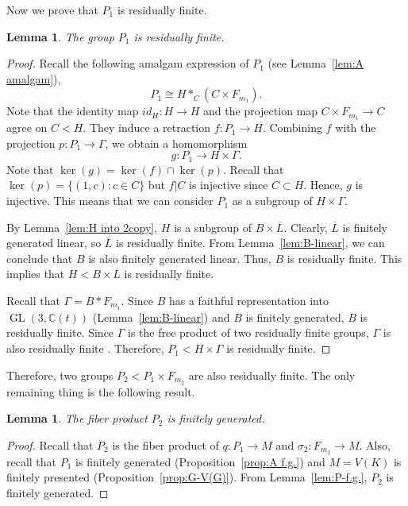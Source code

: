 \documentclass[11pt]{amsart}
\newtheorem{lem}[thm]{Lemma}
\theoremstyle{definition}
\DeclareMathOperator{\GL}{GL}
\newcommand{\CC}{\mathbb{C}}
\begin{document}
 Now we prove that $P_1$ is residually finite.

 \begin{lem} \label{lem:A rf}
 The group $P_1$ is residually finite.
 \end{lem}
 \begin{proof}
 Recall the following amalgam expression of $P_1$ (see Lemma~\ref{lem:A amalgam}),
 $$ P_1 \cong H*_C(C \times F_{m_1} ).$$
 Note that the identity map $id_H:H \to H$ and the projection map $C \times F_{m_1} \to C$ agree on $C<H$.
 They induce a retraction $f:P_1 \to H$.
 Combining $f$ with the projection $p:P_1 \to \Gamma$, we obtain a homomorphism $$g:P_1 \to H \times \Gamma.$$
 Note that $\ker(g)=\ker(f) \cap \ker(p)$.
 Recall that $\ker(p)=\{ (1,c): c \in C \}$ but $f|C$ is injective since $C \subset H$.
 Hence, $g$ is injective.
 This means that we can consider $P_1$ as a subgroup of $H \times \Gamma$.

 By Lemma~\ref{lem:H into 2copy}, $H$ is a subgroup of $B \times \overline{L}$.
 Clearly, $\overline{L}$ is finitely generated linear, so $\overline{L}$ is residually finite.
 From Lemma~\ref{lem:B-linear}, we can conclude that $B$ is also finitely generated linear.
 Thus, $B$ is residually finite. This implies that $H<B \times \overline{L}$ is residually finite.

 Recall that $\Gamma=B * F_{m_1}$.
 Since $B$ has a faithful representation into $\GL(3,\CC(t))$ (Lemma~\ref{lem:B-linear}) and $B$ is finitely generated, $B$ is residually finite.
 Since $\Gamma$ is the free product of two residually finite groups, $\Gamma$ is also residually finite \cite[Corollary (ii) on p.44]{MR87652}.
 Therefore, $P_1 < H \times \Gamma$ is residually finite.
 \end{proof}
 
 Therefore, two groups $P_2 < P_1 \times F_{m_2}$ are also residually finite.
 The only remaining thing is the following result.

 \begin{lem}
 The fiber product $P_2$ is finitely generated.
 \end{lem}
 \begin{proof}
 Recall that $P_2$ is the fiber product of $q: P_1 \to M$ and $\sigma_2:F_{m_2} \to M$.
 Also, recall that $P_1$ is finitely generated (Proposition~\ref{prop:A f.g.}) and $M=V(K)$ is finitely presented (Proposition~\ref{prop:G-V(G)}).
 From Lemma~\ref{lem:P-f.g.}, $P_2$ is finitely generated.
 \end{proof}
\end{document}
